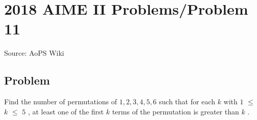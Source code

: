 \documentclass[12pt]{article}
\begin{document}
\section*{{2018 AIME II Problems/Problem 11}}
Source: AoPS Wiki

\subsection*{Problem}
Find the number of permutations of $1, 2, 3, 4, 5, 6$ such that for each $k$ with $1$ $\leq$ $k$ $\leq$ $5$ , at least one of the first $k$ terms of the permutation is greater than $k$ .
\end{document}

